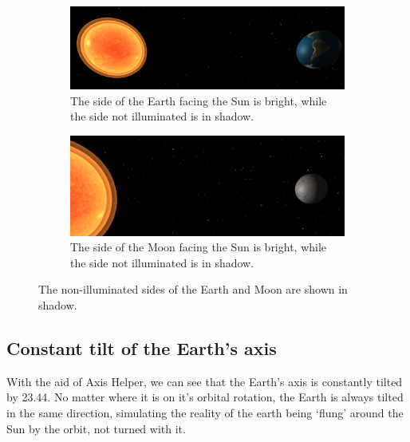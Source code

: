 \documentclass[12pt]{article}
\begin{document}
 \begin{figure}[H]
        \centering
        \begin{subfigure}[b]{0.4\textwidth}
                \includegraphics[width=\textwidth]{images/lightfromphong3}
                \caption{The side of the Earth facing the Sun is bright, while the side not illuminated is in shadow.}
                \label{fig: The side of the Earth facing the Sun is bright, while the side not illuminated is in shadow.}
	 \end{subfigure}
        \begin{subfigure}[b]{0.4\textwidth}
                \includegraphics[width=\textwidth]{images/lightfromphong4}
                \caption{The side of the Moon facing the Sun is bright, while the side not illuminated is in shadow.}
                \label{fig: The side of the Moon facing the Sun is bright, while the side not illuminated is in shadow.}
	 \end{subfigure}
	 \caption{The non-illuminated sides of the Earth and Moon are shown in shadow.}
\end{figure}

\subsection{Constant tilt of the Earth's axis}
With the aid of Axis Helper, we can see that the Earth's axis is constantly tilted by 23.44. No matter where it is on it's orbital rotation, the Earth is always tilted in the same direction, simulating the reality of the earth being `flung' around the Sun by the orbit, not turned with it.
\end{document}
